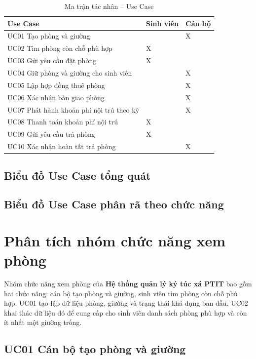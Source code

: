 \begin{table}[H]
\centering
\small
\caption{Ma trận tác nhân -- Use Case}
\label{tab:ch2-4}
\begin{tabularx}{\textwidth}{|>{\raggedright\arraybackslash}X|>{\centering\arraybackslash}p{}|>{\centering\arraybackslash}p{}|}
\hline
\textbf{Use Case} & \textbf{Sinh viên} & \textbf{Cán bộ} \\
\hline
UC01 Tạo phòng và giường &  & X \\
\hline
UC02 Tìm phòng còn chỗ phù hợp & X & \\
\hline
UC03 Gửi yêu cầu đặt phòng & X & \\
\hline
UC04 Giữ phòng và giường cho sinh viên &  & X \\
\hline
UC05 Lập hợp đồng thuê phòng &  & X \\
\hline
UC06 Xác nhận bàn giao phòng &  & X \\
\hline
UC07 Phát hành khoản phí nội trú theo kỳ &  & X \\
\hline
UC08 Thanh toán khoản phí nội trú & X & \\
\hline
UC09 Gửi yêu cầu trả phòng & X & \\
\hline
UC10 Xác nhận hoàn tất trả phòng &  & X \\
\hline
\end{tabularx}
\end{table}

\subsection{Biểu đồ Use Case tổng quát}


\subsection{Biểu đồ Use Case phân rã theo chức năng}


\section{Phân tích nhóm chức năng xem phòng}

Nhóm chức năng xem phòng của \textbf{Hệ thống quản lý ký túc xá PTIT} bao gồm hai chức năng: cán bộ tạo phòng và giường, sinh viên tìm phòng còn chỗ phù hợp. UC01 tạo lập dữ liệu phòng, giường và trạng thái khả dụng ban đầu. UC02 khai thác dữ liệu đó để cung cấp cho sinh viên danh sách phòng phù hợp và còn ít nhất một giường trống.

\subsection{UC01 Cán bộ tạo phòng và giường}

